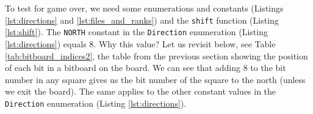 \documentclass[12pt,a4paper,twoside,openright]{book}
\begin{document}
To test for game over, we need some enumerations and constants (Listings \ref{lst:directions} and \ref{lst:files_and_ranks}) and the \texttt{shift} function (Listing \ref{lst:shift}). The \texttt{NORTH} constant in the \texttt{Direction} enumeration (Listing \ref{lst:directions}) equals $8$. Why this value? Let us revisit below, see Table \ref{tab:bitboard_indices2}, the table from the previous section showing the position of each bit in a bitboard on the board. We can see that adding $8$ to the bit number in any square gives us the bit number of the square to the north (unless we exit the board). The same applies to the other constant values in the \texttt{Direction} enumeration (Listing \ref{lst:directions}). 
\end{document}
